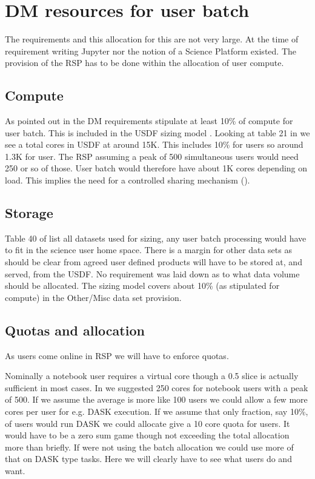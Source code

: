 \section{DM resources for user batch} \label{sec:resources}
The requirements and this allocation for this are not very large.
At the time of requirement writing Jupyter nor the notion of a Science Platform existed.
The provision of the RSP has to be done within the allocation of user compute.


\subsection{Compute} \label{sec:compute}
As pointed out in  the DM requirements stipulate at least
10\% of compute for user batch.
This is included in the USDF sizing model .
Looking at table 21 in  we see a total cores in USDF  at around 15K.
This includes 10\% for users so around 1.3K for user.
The RSP assuming a peak of 500 simultaneous users would need 250 or so of those.
User batch would therefore have about 1K cores depending on load.
This implies the need for a controlled sharing mechanism ().



\subsection{Storage}
Table 40 of  list all datasets used for sizing,
any user batch processing would have to fit in the science user home space.
There is a margin for other data sets as should be clear from  agreed user defined products will have to be stored at, and served, from the USDF.
No requirement was laid down as to what data volume should be allocated.
The sizing model covers about 10\%  (as stipulated for compute) in the Other/Misc data set provision.


\subsection{Quotas and allocation} \label{sec:quotas}

As users come online in RSP we will have to enforce quotas.

Nominally a notebook user requires a virtual core though a 0.5 slice is actually sufficient in most cases.
In  we suggested 250 cores for notebook users with a peak of 500. If we assume the average is more like 100 users we could allow a few more cores per user for e.g. DASK execution. If we assume that only  fraction, say 10\%,  of users would run DASK we could allocate give a 10 core quota for users.
It would have to be a zero sum game though not exceeding the total allocation more than briefly.
If were not using the batch allocation we could use more of that on DASK type tasks.
Here we will clearly have to see what users do and want.

